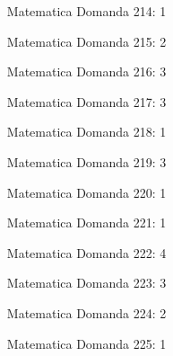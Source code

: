 \documentclass[20pt, a4paper]{article}
\begin{document}
\begin{itemize}[leftmargin=*]
\item [Matematica] Domanda 214: 1
\item [Matematica] Domanda 215: 2
\item [Matematica] Domanda 216: 3
\item [Matematica] Domanda 217: 3
\item [Matematica] Domanda 218: 1
\item [Matematica] Domanda 219: 3
\item [Matematica] Domanda 220: 1
\item [Matematica] Domanda 221: 1
\item [Matematica] Domanda 222: 4
\item [Matematica] Domanda 223: 3
\item [Matematica] Domanda 224: 2
\item [Matematica] Domanda 225: 1
\end{itemize}
\end{document}
